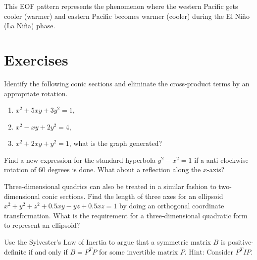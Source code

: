 This EOF pattern represents the  phenomenon where the western Pacific gets cooler (warmer) and eastern Pacific becomes warmer (cooler) during the El Niño (La Niña) phase.

\section{Exercises}

\begin{Exercise}
Identify the following conic sections and eliminate the cross-product terms by an appropriate rotation.
\begin{enumerate}[label=(\alph*)]
\item $x^2 + 5xy + 3y^2 = 1$,
\item $x^2 - xy + 2y^2 = 4$,
\item $x^2 + 2xy + y^2 = 1$, what is the graph generated? 
\end{enumerate}
\end{Exercise}

\begin{Exercise}
Find a new expression for the standard hyperbola $y^2 - x^2 = 1$ if a anti-clockwise rotation of $60$ degrees is done. What about a reflection along the $x$-axis?
\end{Exercise}

\begin{Exercise}
Three-dimensional quadrics can also be treated in a similar fashion to two-dimensional conic sections. Find the length of three axes for an ellipsoid $x^2 + y^2 + z^2 + 0.5xy - yz + 0.5xz = 1$ by doing an orthogonal coordinate transformation. What is the requirement for a three-dimensional quadratic form to represent an ellipsoid?
\end{Exercise}

\begin{Exercise}
Use the Sylvester's Law of Inertia to argue that a symmetric matrix $B$ is positive-definite if and only if $B = P^TP$ for some invertible matrix $P$. Hint: Consider $P^T IP$.
\end{Exercise}

